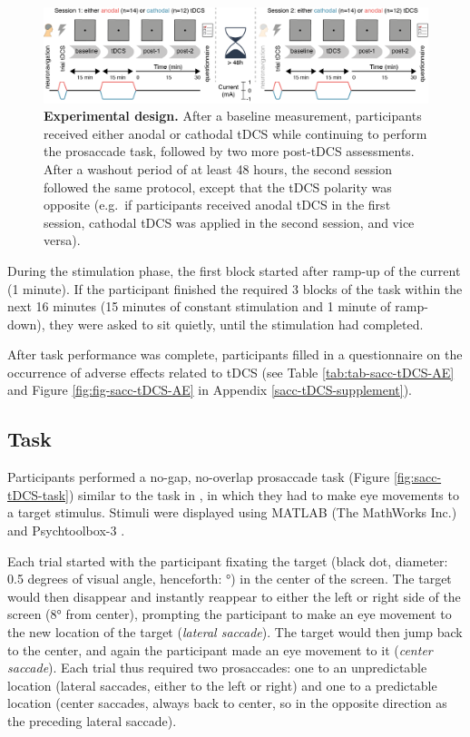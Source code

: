 \documentclass[11pt,]{memoir}
\begin{document}
\begin{figure}
\includegraphics[width=130mm]{sacc_tDCS_files/figures/figure_1_procedure} \caption{\textbf{Experimental design.} After a baseline measurement, participants received either anodal or cathodal tDCS while continuing to perform the prosaccade task, followed by two more post-tDCS assessments. After a washout period of at least 48 hours, the second session followed the same protocol, except that the tDCS polarity was opposite (e.g.~if participants received anodal tDCS in the first session, cathodal tDCS was applied in the second session, and vice versa).}\label{fig:sacc-tDCS-procedure}
\end{figure}



During the stimulation phase, the first block started after ramp-up of the current (1 minute). If the participant finished the required 3 blocks of the task within the next 16 minutes (15 minutes of constant stimulation and 1 minute of ramp-down), they were asked to sit quietly, until the stimulation had completed.

After task performance was complete, participants filled in a questionnaire on the occurrence of adverse effects related to tDCS (see Table \ref{tab:tab-sacc-tDCS-AE} and Figure \ref{fig:fig-sacc-tDCS-AE} in Appendix \ref{sacc-tDCS-supplement}).

\hypertarget{sacc-task}{%
\subsection{Task}\label{sacc-task}}

Participants performed a no-gap, no-overlap prosaccade task (Figure \ref{fig:sacc-tDCS-task}) similar to the task in \textcite{Kanai2012}, in which they had to make eye movements to a target stimulus. Stimuli were displayed using MATLAB (The MathWorks Inc.) and Psychtoolbox-3 \autocites{Brainard1997}{Pelli1997}{Kleiner2007}.

Each trial started with the participant fixating the target (black dot, diameter: 0.5 degrees of visual angle, henceforth: °) in the center of the screen. The target would then disappear and instantly reappear to either the left or right side of the screen (8° from center), prompting the participant to make an eye movement to the new location of the target (\emph{lateral saccade}). The target would then jump back to the center, and again the participant made an eye movement to it (\emph{center saccade}). Each trial thus required two prosaccades: one to an unpredictable location (lateral saccades, either to the left or right) and one to a predictable location (center saccades, always back to center, so in the opposite direction as the preceding lateral saccade).
\end{document}
